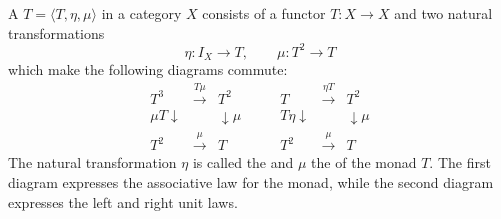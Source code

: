 A  $T = \langle T, \eta, \mu \rangle$ in a category $X$ consists of a functor $T: X \to X$ and two natural transformations
$$
\eta: I_X \to T, \qquad \mu: T^2 \to T
$$
which make the following diagrams commute:
$$
\begin{array}{ccc}
T^3 & \xrightarrow{T\mu} & T^2 \\
{\scriptstyle \mu T}\downarrow & & \downarrow{\scriptstyle \mu} \\
T^2 & \xrightarrow{\mu} & T
\end{array}
\qquad
\begin{array}{ccc}
T & \xrightarrow{\eta T} & T^2 \\
{\scriptstyle T\eta}\downarrow & & \downarrow{\scriptstyle \mu} \\
T^2 & \xrightarrow{\mu} & T
\end{array}
$$
The natural transformation $\eta$ is called the  and $\mu$ the  of the monad $T$. The first diagram expresses the associative law for the monad, while the second diagram expresses the left and right unit laws.
